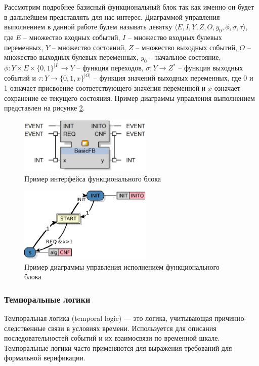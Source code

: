 \documentclass[14pt]{extarticle}
\theoremstyle{plain}
\theoremstyle{definition}
\begin{document}
Рассмотрим подробнее базисный функциональный блок так как именно он будет в
дальнейшем представлять для нас интерес.
Диаграммой управления выполнением в данной работе будем называть девятку $\langle E, I, Y, Z, O, y_0, \phi,
\sigma, \tau \rangle$, где $E$ -- множество входных событий, $I$ -- множество
входных булевых переменных, $Y$ -- множество состояний, $Z$ -- множество
выходных событий, $O$ -- множество выходных булевых переменных, $y_0$ --
начальное состояние, $\phi : Y \times E \times \{0, 1\}^{|I|} \rightarrow
Y$ -- функция переходов, $\sigma : Y \rightarrow Z^*$ -- функция выходных
событий и $\tau : Y \rightarrow \{0, 1, x\}^{|O|}$ -- функция значений
выходных переменных, где 0 и 1 означает присвоение соответствующего значения
переменной и $x$ означает сохранение ее текущего состояния. Пример диаграммы
управления выполнением представлен на рисунке \ref{ecc-example}.

\begin{figure}[t]
    \centering
    \includegraphics[width=2.5in]{pic/ecc-interface.eps}
    \caption{Пример интерфейса функционального блока}
    \label{fb-interface-example}
\end{figure}

\begin{figure}[t]
    \centering
    \includegraphics[width=2.5in]{pic/ecc-example.eps}
    \caption{Пример диаграммы управления исполнением функционального блока}
    \label{ecc-example}
\end{figure}

\subsubsection{Темпоральные логики}

Темпоральная логика (temporal logic) \cite{tl} --- это логика, учитывающая причинно-следственные связи в условиях времени.
Используется для описания последовательностей событий и их взаимосвязи по временной шкале.
Темпоральные логики часто применяются для выражения требований для формальной верификации.
\end{document}
